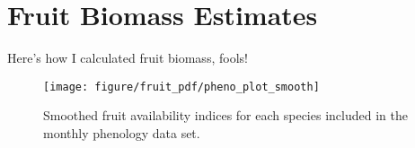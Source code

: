 \documentclass{article}\usepackage[]{graphicx}\usepackage[]{color}
\newenvironment{knitrout}{}{} %
\begin{document}
\section*{Fruit Biomass Estimates}

Here's how I calculated fruit biomass, fools!














\begin{figure}
\begin{knitrout}
\color{fgcolor}

{\centering \texttt{[image: figure/fruit\_pdf/pheno\_plot\_smooth]} 

}



\end{knitrout}

\caption{Smoothed fruit availability indices for each species included in the monthly phenology data set.}
\end{figure}
\end{document}
